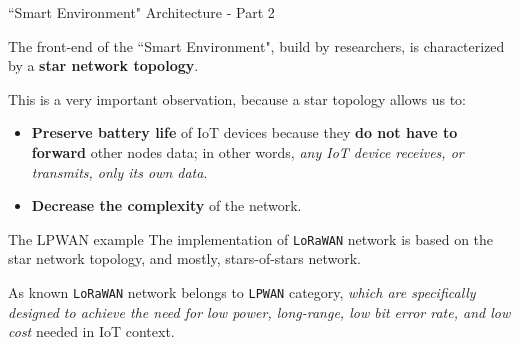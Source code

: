 \documentclass[10pt]{beamer}
\begin{document}
\begin{frame}{``Smart Environment" Architecture - Part 2}

\begin{block}{}
The front-end of the ``Smart Environment", build by researchers, is characterized by a \textbf{star network topology}.
\end{block}

This is a very important observation, because a star topology allows us to:

\begin{itemize}
\justifying
\item \textbf{Preserve battery life} of IoT devices because they \textbf{do not have to forward} other nodes data; in other words, \textit{any IoT device receives, or transmits, only its own data}.

\item \textbf{Decrease the complexity} of the network.
\end{itemize}

\begin{block}{The LPWAN example}
\justifying
The implementation of \texttt{LoRaWAN} network is based on the star network topology, and mostly, stars-of-stars network. 

As known \texttt{LoRaWAN} network belongs to \texttt{LPWAN} category, \textit{which are specifically designed to achieve the need for low power, long-range, low bit error rate, and low cost} needed in IoT context. 
\end{block}

\end{frame} 
\end{document}
